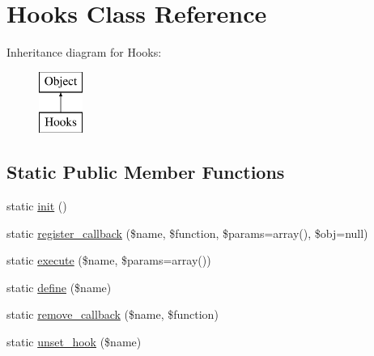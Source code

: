 \hypertarget{class_hooks}{
\section{Hooks Class Reference}
\label{class_hooks}
}
Inheritance diagram for Hooks:\begin{figure}[H]
\begin{center}
\leavevmode
\includegraphics[height=2.000000cm]{class_hooks}
\end{center}
\end{figure}
\subsection*{Static Public Member Functions}
\begin{DoxyCompactItemize}
\item 
static \hyperlink{class_hooks_a9f0be6ae273d3669e11c29910a0be338}{init} ()
\item 
static \hyperlink{class_hooks_abce9b3ebf8dc18ed8cfeccf8d96891da}{register\_\-callback} (\$name, \$function, \$params=array(), \$obj=null)
\item 
static \hyperlink{class_hooks_a755f815c9116b86fbe02b751fad15daf}{execute} (\$name, \$params=array())
\item 
static \hyperlink{class_hooks_a4b487be214594d341f4c06d24ffaecdb}{define} (\$name)
\item 
static \hyperlink{class_hooks_aaf83916ca4e83db452979b41e3c7869f}{remove\_\-callback} (\$name, \$function)
\item 
static \hyperlink{class_hooks_adb935fc4f69e1127fc0aad972b05557b}{unset\_\-hook} (\$name)
\end{DoxyCompactItemize}
